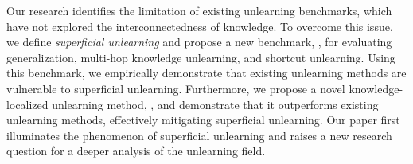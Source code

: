 Our research identifies the limitation of existing unlearning benchmarks, which have not explored the interconnectedness of knowledge. To overcome this issue, we define \textit{superficial unlearning} and propose a new benchmark, \ourdata, for evaluating generalization, multi-hop knowledge unlearning, and shortcut unlearning.
Using this benchmark, we empirically demonstrate that existing unlearning methods are vulnerable to superficial unlearning.
Furthermore, we propose a novel knowledge-localized unlearning method, \ourmodel, and demonstrate that it outperforms existing unlearning methods, effectively mitigating superficial unlearning.
Our paper first illuminates the phenomenon of superficial unlearning and raises a new research question for a deeper analysis of the unlearning field.
